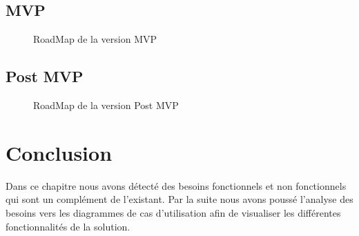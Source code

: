 \subsection{\gls{MVP}}
\begin{figure}[H]
	\caption{\label{fig:my-label} RoadMap de la version \gls{MVP}}
\end{figure}
\subsection{Post MVP}
\begin{figure}[H]
	\caption{\label{fig:my-label} RoadMap de la version Post MVP}
\end{figure}

 
\section{Conclusion}
Dans ce chapitre nous avons d\'etect\'e des besoins fonctionnels et non fonctionnels qui sont un compl\'ement de l'existant. Par la suite nous avons pouss\'e l'analyse des besoins vers les diagrammes de cas d'utilisation afin de visualiser les diff\'erentes fonctionnalit\'es de la solution.